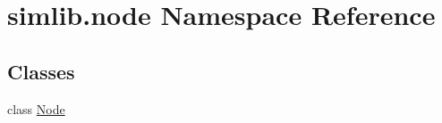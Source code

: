 \hypertarget{namespacesimlib_1_1node}{}\section{simlib.\+node Namespace Reference}
\label{namespacesimlib_1_1node}
\subsection*{Classes}
\begin{DoxyCompactItemize}
\item 
class \mbox{\hyperlink{classsimlib_1_1node_1_1_node}{Node}}
\end{DoxyCompactItemize}
